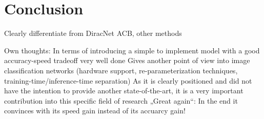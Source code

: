 \section{Conclusion}



Clearly differentiate from DiracNet ACB, other methods

Own thoughts: 
In terms of introducing a simple to implement model with a good accuracy-speed tradeoff very well done
Gives another point of view into image classification networks (hardware support, re-parameterization techniques, training-time/inference-time separation)
As it is clearly positioned and did not have the intention to provide another state-of-the-art, it is a very important contribution into this specific field of research
„Great again“: In the end it convinces with its speed gain instead of its accuarcy gain!

